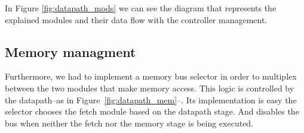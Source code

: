 In Figure \ref{fig:datapath_mods} we can see the diagram that represents the explained modules and
their data flow with the controller management.

\subsection{Memory managment}

Furthermore, we had to implement a memory bus selector
in order to multiplex between the two modules that make memory access. This
logic is controlled by the datapath--as in Figure~\ref{fig:datapath_mem}--.
Its implementation is easy the selector chooses the fetch module based on the
datapath stage. And disables the bus when neither the fetch nor the memory
stage is being executed.


